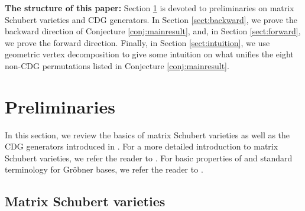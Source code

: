 \documentclass[ALCO,Unicode,published]{cedram}
\begin{document}
\noindent\textbf{The structure of this paper:} Section \ref{sect:prelim} is devoted to preliminaries on matrix Schubert varieties and CDG generators.  In Section \ref{sect:backward}, we prove the backward direction of Conjecture \ref{conj:mainresult}, and, in Section \ref{sect:forward}, we prove the forward direction.  Finally, in Section \ref{sect:intuition}, we use geometric vertex decomposition to give some intuition on what unifies the eight non-CDG permutations listed in Conjecture \ref{conj:mainresult}.

\section{Preliminaries}\label{sect:prelim}

In this section, we review the basics of matrix Schubert varieties as well as the CDG generators introduced in \cite{HPW}.  For a more detailed introduction to matrix Schubert varieties, we refer the reader to \cite[Chapter 10]{Ful96}.  For basic properties of and standard terminology for Gr\"obner bases, we refer the reader to \cite{Eis95}.  

\subsection{Matrix Schubert varieties}\label{subsect:MSv}
\end{document}
